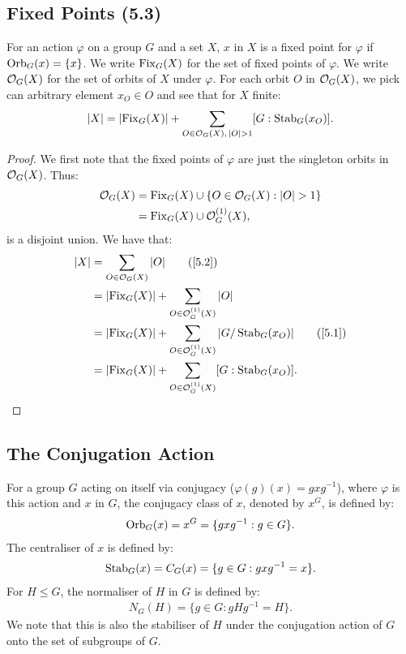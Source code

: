 \subsection{Fixed Points (5.3)} \label{5.3}

For an action $\varphi$ on a group $G$ and a set $X$, $x$ in $X$ is a fixed point
for $\varphi$ if $\operatorname{Orb}_G(x) = \{x\}$. We write $\operatorname{Fix}_G(X)$ for the set of fixed points 
of $\varphi$. We write $\mathcal{O}_G(X)$ for the set of orbits of $X$ under $\varphi$. 
For each orbit $O$ in $\mathcal{O}_G(X)$, we pick can arbitrary element $x_O \in O$
and see that for $X$ finite: \begin{align*}
    |X| = |\!\operatorname{Fix}_G(X)| + \sum_{O \in \mathcal{O}_G(X), \, |O| > 1} [G : \operatorname{Stab}_G(x_O)].
\end{align*}

\begin{proof}
    We first note that the fixed points of $\varphi$ are just the singleton orbits
    in $\mathcal{O}_G(X)$. Thus: \begin{align*}
        \mathcal{O}_G(X) 
        &= \operatorname{Fix}_G(X) \cup \{O \in \mathcal{O}_G(X) : |O| > 1\} \\
        &= \operatorname{Fix}_G(X) \cup \mathcal{O}_G^{(1)}(X),
    \end{align*} is a disjoint union. We have that: \begin{align*}
        |X| &= \sum_{O \in \mc{O}_G(X)} |O| \tag{\ref{5.2}} \\
        &= |\!\Fix_G(X)| + \sum_{O \in \mc{O}_G^{(1)}(X)} |O| \\
        &= |\!\Fix_G(X)| + \sum_{O \in \mc{O}_G^{(1)}(X)} |G /\Stab_G(x_O)| \tag{\ref{5.1}} \\
        &= |\!\Fix_G(X)| + \sum_{O \in \mc{O}_G^{(1)}(X)} [G : \Stab_G(x_O)]. 
    \end{align*}
\end{proof}

\subsection{The Conjugation Action}

For a group $G$ acting on itself via conjugacy ($\varphi(g)(x) = gxg^{-1}$), where
$\varphi$ is this action and
$x$ in $G$, the conjugacy class of $x$, denoted by $x^G$, is defined by: \begin{align*}
    \operatorname{Orb}_G(x) = x^G = \{gxg^{-1} : g \in G\}.
\end{align*} The centraliser of $x$ is defined by: \begin{align*}
    \operatorname{Stab}_G(x) = C_G(x) = \{g \in G : gxg^{-1} = x\}.
\end{align*} For $H \leq G$, the normaliser of $H$ in $G$ is defined by: \begin{align*}
    N_G(H) = \{g \in G : gHg^{-1} = H\}.
\end{align*} We note that this is also the stabiliser of $H$ under the
conjugation action of $G$ onto the set of subgroups of $G$.

